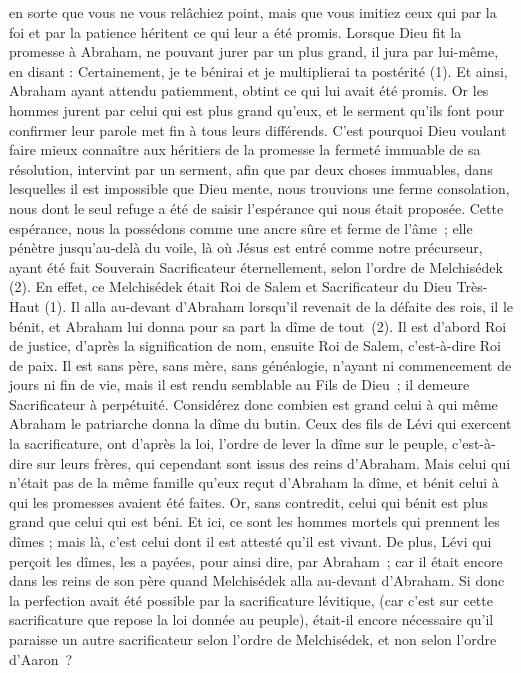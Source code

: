 \begin{multicols}{2}
en sorte que vous ne vous relâchiez point, mais que vous imitiez ceux qui par la foi et par la patience héritent ce qui leur a été promis.
Lorsque Dieu fit la promesse à Abraham, ne pouvant jurer par un plus grand, il jura par lui-même,
en disant : Certainement, je te bénirai et je multiplierai ta postérité (1).
Et ainsi, Abraham ayant attendu patiemment, obtint ce qui lui avait été promis.
Or les hommes jurent par celui qui est plus grand qu'eux, et le serment qu'ils font pour confirmer leur parole met fin à tous leurs différends.
C'est pourquoi Dieu voulant faire mieux connaître aux héritiers de la promesse la fermeté immuable de sa résolution, intervint par un serment,
afin que par deux choses immuables, dans lesquelles il est impossible que Dieu mente, nous trouvions une ferme consolation, nous dont le seul refuge a été de saisir l'espérance qui nous était proposée.
Cette espérance, nous la possédons comme une ancre sûre et ferme de l'âme ; elle pénètre jusqu'au-delà du voile,
là où Jésus est entré comme notre précurseur, ayant été fait Souverain Sacrificateur éternellement, selon l'ordre de Melchisédek (2).
\VerseOne{}En effet, ce Melchisédek était Roi de Salem et Sacrificateur du Dieu Très-Haut (1). Il alla au-devant d'Abraham lorsqu'il revenait de la défaite des rois, il le bénit,
et Abraham lui donna pour sa part la dîme de tout (2). Il est d’abord Roi de justice, d’après la signification de nom, ensuite Roi de Salem, c’est-à-dire Roi de paix.
Il est sans père, sans mère, sans généalogie, n'ayant ni commencement de jours ni fin de vie, mais il est rendu semblable au Fils de Dieu ; il demeure Sacrificateur à perpétuité.
Considérez donc combien est grand celui à qui même Abraham le patriarche donna la dîme du butin.
Ceux des fils de Lévi qui exercent la sacrificature, ont d’après la loi, l’ordre de lever la dîme sur le peuple, c'est-à-dire sur leurs frères, qui cependant sont issus des reins d'Abraham.
Mais celui qui n’était pas de la même famille qu’eux reçut d’Abraham la dîme, et bénit celui à qui les promesses avaient été faites.
Or, sans contredit, celui qui bénit est plus grand que celui qui est béni.
Et ici, ce sont les hommes mortels qui prennent les dîmes ; mais là, c’est celui dont il est attesté qu’il est vivant.
De plus, Lévi qui perçoit les dîmes, les a payées, pour ainsi dire, par Abraham ;
car il était encore dans les reins de son père quand Melchisédek alla au-devant d’Abraham.
Si donc la perfection avait été possible par la sacrificature lévitique, (car c'est sur cette sacrificature que repose la loi donnée au peuple), était-il encore nécessaire qu’il paraisse un autre sacrificateur selon l'ordre de Melchisédek, et non selon l'ordre d'Aaron ?

\end{multicols}
